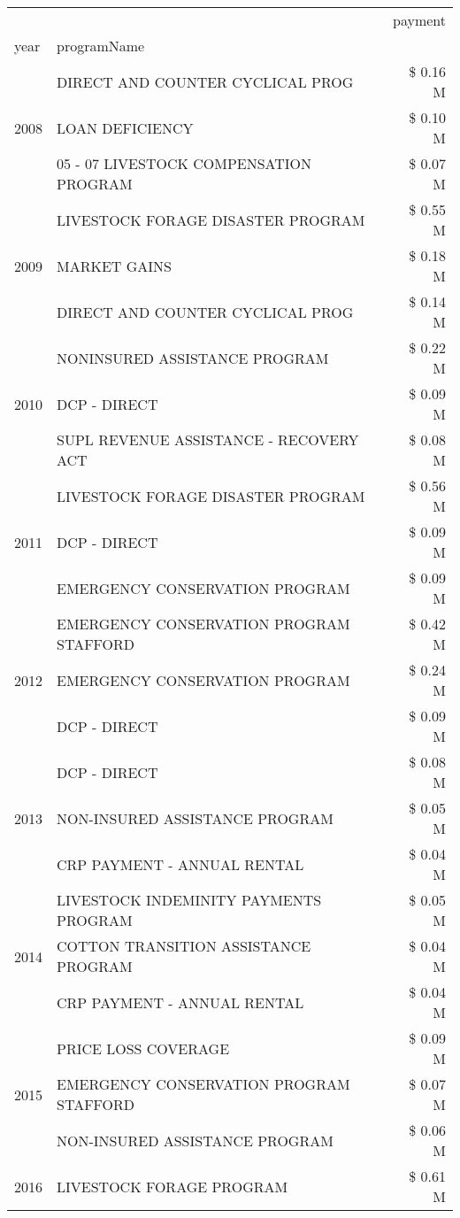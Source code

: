\begin{tabular}{llr}
\toprule
 &  & payment \\
year & programName &  \\
\midrule
\multirow[t]{3}{*}{2008} & DIRECT AND COUNTER CYCLICAL PROG & \$ 0.16 M \\
 & LOAN DEFICIENCY & \$ 0.10 M \\
 & 05 - 07 LIVESTOCK COMPENSATION PROGRAM & \$ 0.07 M \\
\cline{1-3}
\multirow[t]{3}{*}{2009} & LIVESTOCK FORAGE DISASTER  PROGRAM & \$ 0.55 M \\
 & MARKET GAINS & \$ 0.18 M \\
 & DIRECT AND COUNTER CYCLICAL PROG & \$ 0.14 M \\
\cline{1-3}
\multirow[t]{3}{*}{2010} & NONINSURED ASSISTANCE PROGRAM & \$ 0.22 M \\
 & DCP - DIRECT & \$ 0.09 M \\
 & SUPL REVENUE ASSISTANCE - RECOVERY ACT & \$ 0.08 M \\
\cline{1-3}
\multirow[t]{3}{*}{2011} & LIVESTOCK FORAGE DISASTER PROGRAM & \$ 0.56 M \\
 & DCP - DIRECT & \$ 0.09 M \\
 & EMERGENCY CONSERVATION PROGRAM & \$ 0.09 M \\
\cline{1-3}
\multirow[t]{3}{*}{2012} & EMERGENCY CONSERVATION PROGRAM STAFFORD & \$ 0.42 M \\
 & EMERGENCY CONSERVATION PROGRAM & \$ 0.24 M \\
 & DCP - DIRECT & \$ 0.09 M \\
\cline{1-3}
\multirow[t]{3}{*}{2013} & DCP - DIRECT & \$ 0.08 M \\
 & NON-INSURED ASSISTANCE PROGRAM & \$ 0.05 M \\
 & CRP PAYMENT - ANNUAL RENTAL & \$ 0.04 M \\
\cline{1-3}
\multirow[t]{3}{*}{2014} & LIVESTOCK INDEMINITY PAYMENTS PROGRAM & \$ 0.05 M \\
 & COTTON TRANSITION ASSISTANCE PROGRAM & \$ 0.04 M \\
 & CRP PAYMENT - ANNUAL RENTAL & \$ 0.04 M \\
\cline{1-3}
\multirow[t]{3}{*}{2015} & PRICE LOSS COVERAGE & \$ 0.09 M \\
 & EMERGENCY CONSERVATION PROGRAM STAFFORD & \$ 0.07 M \\
 & NON-INSURED ASSISTANCE PROGRAM & \$ 0.06 M \\
\cline{1-3}
\multirow[t]{3}{*}{2016} & LIVESTOCK FORAGE PROGRAM & \$ 0.61 M \\

\end{tabular}
